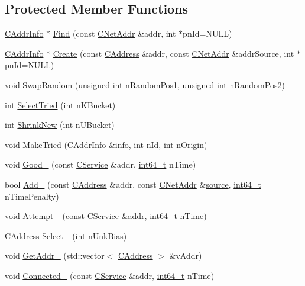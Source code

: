 \subsection*{Protected Member Functions}
\begin{DoxyCompactItemize}
\item 
\hyperlink{class_c_addr_info}{C\+Addr\+Info} $\ast$ \hyperlink{class_c_addr_man_ac961ead1a1afde144fc486b6d7c7369d}{Find} (const \hyperlink{class_c_net_addr}{C\+Net\+Addr} \&addr, int $\ast$pn\+Id=N\+U\+L\+L)
\item 
\hyperlink{class_c_addr_info}{C\+Addr\+Info} $\ast$ \hyperlink{class_c_addr_man_aac93f51c0580e38a950a0f63b053bedb}{Create} (const \hyperlink{class_c_address}{C\+Address} \&addr, const \hyperlink{class_c_net_addr}{C\+Net\+Addr} \&addr\+Source, int $\ast$pn\+Id=N\+U\+L\+L)
\item 
void \hyperlink{class_c_addr_man_a3074bc8e3dcfb5348054613f575dc38e}{Swap\+Random} (unsigned int n\+Random\+Pos1, unsigned int n\+Random\+Pos2)
\item 
int \hyperlink{class_c_addr_man_a9c466eca7afe5c12554da5734f89e656}{Select\+Tried} (int n\+K\+Bucket)
\item 
int \hyperlink{class_c_addr_man_aebf83da3addc3bcee487a87ece3f9a2b}{Shrink\+New} (int n\+U\+Bucket)
\item 
void \hyperlink{class_c_addr_man_a0fd16da2a89fb973e8e0e1bb6183264a}{Make\+Tried} (\hyperlink{class_c_addr_info}{C\+Addr\+Info} \&info, int n\+Id, int n\+Origin)
\item 
void \hyperlink{class_c_addr_man_a33ec6a4584cf4b17af821e6e35216459}{Good\+\_\+} (const \hyperlink{class_c_service}{C\+Service} \&addr, \hyperlink{stdint_8h_adec1df1b8b51cb32b77e5b86fff46471}{int64\+\_\+t} n\+Time)
\item 
bool \hyperlink{class_c_addr_man_a9dd6df8b1904548a86054d19d4a90724}{Add\+\_\+} (const \hyperlink{class_c_address}{C\+Address} \&addr, const \hyperlink{class_c_net_addr}{C\+Net\+Addr} \&\hyperlink{debugconsole_8cpp_af2ed45b90afa2ef4ec6e09625335a082}{source}, \hyperlink{stdint_8h_adec1df1b8b51cb32b77e5b86fff46471}{int64\+\_\+t} n\+Time\+Penalty)
\item 
void \hyperlink{class_c_addr_man_ab1a1bfa8b435ef139570c88de1a5245f}{Attempt\+\_\+} (const \hyperlink{class_c_service}{C\+Service} \&addr, \hyperlink{stdint_8h_adec1df1b8b51cb32b77e5b86fff46471}{int64\+\_\+t} n\+Time)
\item 
\hyperlink{class_c_address}{C\+Address} \hyperlink{class_c_addr_man_acd799cecb73e466d1369e6e2f23d3a8d}{Select\+\_\+} (int n\+Unk\+Bias)
\item 
void \hyperlink{class_c_addr_man_aff86d04dc7c0e0afae3ff5998417db17}{Get\+Addr\+\_\+} (std\+::vector$<$ \hyperlink{class_c_address}{C\+Address} $>$ \&v\+Addr)
\item 
void \hyperlink{class_c_addr_man_a1ae72643c51293f3f3345e74ce0368ca}{Connected\+\_\+} (const \hyperlink{class_c_service}{C\+Service} \&addr, \hyperlink{stdint_8h_adec1df1b8b51cb32b77e5b86fff46471}{int64\+\_\+t} n\+Time)
\end{DoxyCompactItemize}


